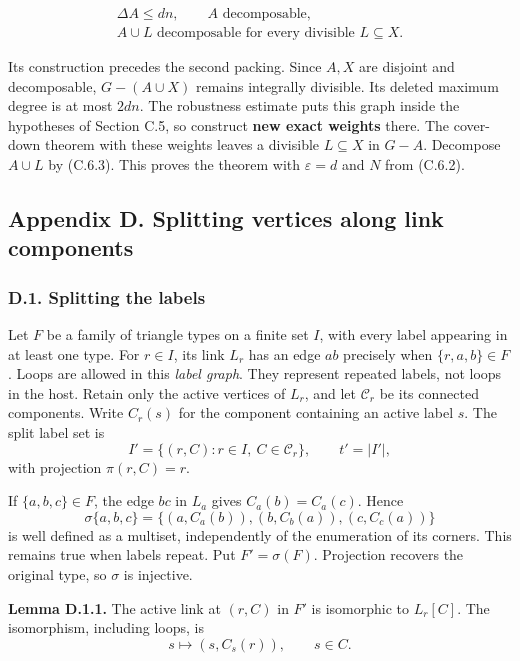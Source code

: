\documentclass[english,11pt,a4paper]{article}
\begin{document}
\[\begin{gathered}
\Delta A\le dn,\qquad A\text{ decomposable},\\
A\cup L\text{ decomposable for every divisible }L\subseteq X.
\end{gathered}
\tag{C.6.3}\]

Its construction precedes the second packing. Since \(A,X\) are disjoint and decomposable, \(G-(A\cup X)\) remains integrally divisible. Its deleted maximum degree is at most \(2dn\). The robustness estimate puts this graph inside the hypotheses of Section C.5, so construct \textbf{new exact weights} there. The cover-down theorem with these weights leaves a divisible \(L\subseteq X\) in \(G-A\). Decompose \(A\cup L\) by (C.6.3). This proves the theorem with \(\varepsilon=d\) and \(N\) from (C.6.2).

\bigskip

\subsection{Appendix D. Splitting vertices along link components}\label{appendix-d.-splitting-vertices-along-link-components}

\subsubsection{D.1. Splitting the labels}\label{d.1.-splitting-the-labels}

Let \(F\) be a family of triangle types on a finite set \(I\), with every label appearing in at least one type. For \(r\in I\), its link \(L_r\) has an edge \(ab\) precisely when \(\{r,a,b\}\in F\). Loops are allowed in this \emph{label graph}. They represent repeated labels, not loops in the host. Retain only the active vertices of \(L_r\), and let \(\mathcal C_r\) be its connected components. Write \(C_r(s)\) for the component containing an active label \(s\). The split label set is \[I'=\{(r,C):r\in I,\ C\in\mathcal C_r\},\qquad t'=|I'|,\] with projection \(\pi(r,C)=r\).

If \(\{a,b,c\}\in F\), the edge \(bc\) in \(L_a\) gives \(C_a(b)=C_a(c)\). Hence \[\sigma\{a,b,c\}
=\{(a,C_a(b)),(b,C_b(a)),(c,C_c(a))\}
\tag{D.1.1}\] is well defined as a multiset, independently of the enumeration of its corners. This remains true when labels repeat. Put \(F'=\sigma(F)\). Projection recovers the original type, so \(\sigma\) is injective.

\textbf{Lemma D.1.1.} The active link at \((r,C)\) in \(F'\) is isomorphic to \(L_r[C]\). The isomorphism, including loops, is \[s\longmapsto (s,C_s(r)),\qquad s\in C.
\tag{D.1.2}\]
\end{document}
